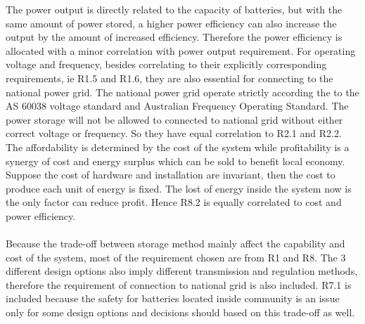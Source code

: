 \documentclass{article}
\begin{document}
The power output is directly related to the capacity of batteries, but with the same amount of power stored, a higher power efficiency can also increase the output by the amount of increased efficiency. Therefore the power efficiency is allocated with a minor correlation with power output requirement. For operating voltage and frequency, besides correlating to their explicitly corresponding requirements, ie R1.5 and R1.6, they are also essential for connecting to the national power grid. The national power grid operate strictly according the to the AS 60038 voltage standard and Australian Frequency Operating Standard. The power storage will not be allowed to connected to national grid without either correct voltage or frequency. So they have equal correlation to R2.1 and R2.2. The affordability is determined by the cost of the system while profitability is a synergy of cost and energy surplus which can be sold to benefit local economy. Suppose the cost of hardware and installation are invariant, then the cost to produce each unit of energy is fixed. The lost of energy inside the system now is the only factor can reduce profit. Hence R8.2 is equally correlated to cost and power efficiency.\\
\\
Because the trade-off between storage method mainly affect the capability and cost of the system, most of the requirement chosen are from R1 and R8. The 3 different design options also imply different transmission and regulation methods, therefore the requirement of connection to national grid is also included. R7.1 is included because the safety for batteries located inside community is an issue only for some design options and decisions should based on this trade-off as well.
\end{document}

